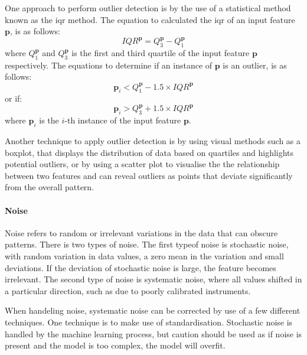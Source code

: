 \documentclass[10pt, conference]{IEEEtran}
\begin{document}
One approach to perform outlier detection is by the use of a statistical method known as the \acrfull{iqr} method.
The equation to calculated the \acrshort{iqr} of an input feature $\boldsymbol{\textbf{p}}$, is as follows:
\begin{equation}
    IQR^{\boldsymbol{\textbf{p}}} = Q_3^{\boldsymbol{\textbf{p}}} - Q_1^{\boldsymbol{\textbf{p}}} \label{IQR}
\end{equation}
where $Q_1^{\boldsymbol{\textbf{p}}}$ and $Q_3^{\boldsymbol{\textbf{p}}}$ is the first and third quartile of the input
feature ${\boldsymbol{\textbf{p}}}$ respectively. The equations to determine if an instance of ${\boldsymbol{\textbf{p}}}$
is an outlier, is as follows:
\begin{equation}
    \boldsymbol{\textbf{p}}_i < Q_1^{\boldsymbol{\textbf{p}}} - 1.5 \times IQR^{\boldsymbol{\textbf{p}}} \label{outlier_smaller}
\end{equation}
or if:
\begin{equation}
    \boldsymbol{\textbf{p}}_i > Q_3^{\boldsymbol{\textbf{p}}} + 1.5 \times IQR^{\boldsymbol{\textbf{p}}} \label{outlier_larger}
\end{equation}
where $\boldsymbol{\textbf{p}}_i$ is the $i$-th instance of the input feature ${\boldsymbol{\textbf{p}}}$.

Another technique to apply outlier detection is by using visual methods such as a boxplot, that displays the
distribution of data based on quartiles and highlights potential outliers, or by using a scatter plot to visualise
the the relationship between two features and can reveal outliers as points that deviate significantly from the
overall pattern.

\paragraph{Noise}

Noise refers to random or irrelevant variations in the data that can obscure patterns. There is two types of noise.
The first typeof noise is stochastic noise, with random variation in data values, a zero mean in the variation and
small deviations. If the deviation of stochastic noise is large, the feature becomes irrelevant. The second type
of noise is systematic noise, where all values shifted in a particular direction, such as due to poorly calibrated
instruments.

When handeling noise, systematic noise can be corrected by use of a few different techniques. One technique is to
make use of standardisation. Stochastic noise is handled by the machine learning process, but caution should be
used as if noise is present and the model is too complex, the model will overfit.
\end{document}
